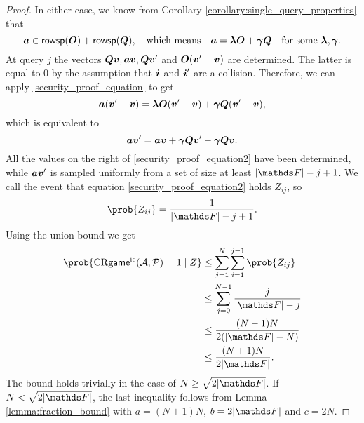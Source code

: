 \begin{proof}
    In either case, we know from Corollary \ref{corollary:single_query_properties} that
    \begin{equation}
    \label{security_proof_equation}
    \boldsymbol a \in \mathsf{rowsp}(\boldsymbol{O}) + \mathsf{rowsp}(\boldsymbol{Q}) ,\quad \textrm{which means} \quad \boldsymbol a = \boldsymbol \lambda \boldsymbol{O} + \boldsymbol \gamma \boldsymbol{Q} \quad \textrm{for some $\boldsymbol\lambda, \boldsymbol\gamma$}.
    \end{equation}
    At query $j$ the vectors $\boldsymbol{Q}\boldsymbol v, \boldsymbol a\boldsymbol v, \boldsymbol{Q}\boldsymbol v'$ and $\boldsymbol{O}(\boldsymbol v' - \boldsymbol v)$ are determined.
    The latter is equal to $0$ by the assumption that $\boldsymbol i$ and $\boldsymbol i'$ are a collision.
    Therefore, we can apply \eqref{security_proof_equation} to get
    \begin{equation*}
    \boldsymbol a (\boldsymbol v' - \boldsymbol v) = \boldsymbol\lambda\boldsymbol{O}(\boldsymbol v' - \boldsymbol v) + \boldsymbol\gamma \boldsymbol{Q} (\boldsymbol v' - \boldsymbol v),
    \end{equation*}
    which is equivalent to
    \begin{equation}
    \label{security_proof_equation2}
    \boldsymbol a \boldsymbol v' = \boldsymbol a\boldsymbol v + \boldsymbol\gamma \boldsymbol{Q} \boldsymbol v' - \boldsymbol\gamma \boldsymbol{Q}\boldsymbol v.
    \end{equation}
    All the values on the right of \eqref{security_proof_equation2} have been determined,
    while $\boldsymbol a\boldsymbol v'$ is sampled uniformly from a set of size at least $|\F| - j + 1$.
    We call the event that equation \eqref{security_proof_equation2} holds $Z_{ij}$, so
    \[
        \prob{Z_{ij}} = \frac{1}{|\F| - j + 1}.
    \]
    Using the union bound we get
    \begin{align}
    \prob{\crgame(\A, \P) = 1 \mid Z} &\leq \sum_{j=1}^{N} \sum_{i=1}^{j-1} \prob{Z_{ij}} \\
    &\leq \sum_{j=0}^{N-1} \frac{j}{|\F| - j} \\
    &\leq \frac{(N-1)N}{2(|\F| - N)} \\
    \label{eq:bound_z}
    &\leq \frac{(N+1)N}{2|\F|}.
    \end{align}
    The bound holds trivially in the case of $N \geq \sqrt{2|\F|}$.
    If $N < \sqrt{2|\F|}$, the last inequality follows from Lemma \ref{lemma:fraction_bound}
    with $a = (N+1)N$, $b = 2|\F|$ and $c = 2N$.


\end{proof}
